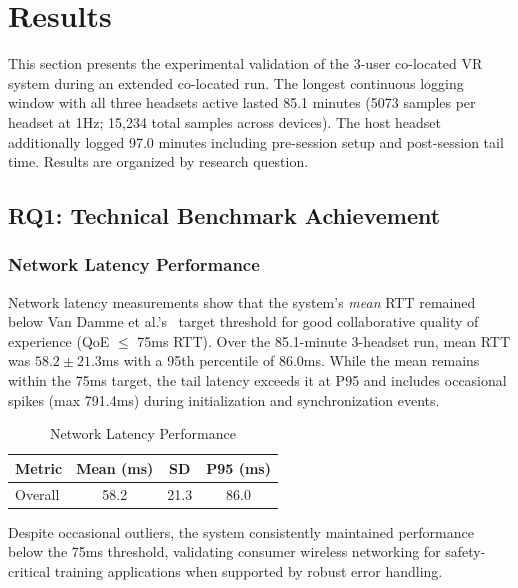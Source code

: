 \section{Results}

This section presents the experimental validation of the 3-user co-located VR system during an extended co-located run. The longest continuous logging window with all three headsets active lasted 85.1 minutes (5073 samples per headset at 1Hz; 15,234 total samples across devices). The host headset additionally logged 97.0 minutes including pre-session setup and post-session tail time. Results are organized by research question.

\subsection{RQ1: Technical Benchmark Achievement}

\subsubsection{Network Latency Performance}

Network latency measurements show that the system's \emph{mean} RTT remained below Van Damme et al.'s~\cite{VanDammeSam2024Iolo} target threshold for good collaborative quality of experience (QoE $\leq$ 75ms RTT). Over the 85.1-minute 3-headset run, mean RTT was $58.2 \pm 21.3$ms with a 95th percentile of 86.0ms. While the mean remains within the 75ms target, the tail latency exceeds it at P95 and includes occasional spikes (max 791.4ms) during initialization and synchronization events.

\begin{table}[h]
\centering
\caption{Network Latency Performance}
\begin{tabular}{|l|c|c|c|}
\hline
			\textbf{Metric} & \textbf{Mean (ms)} & \textbf{SD} & \textbf{P95 (ms)} \\
\hline
Overall & 58.2 & 21.3 & 86.0 \\
\hline
\end{tabular}
\end{table}

Despite occasional outliers, the system consistently maintained performance below the 75ms threshold, validating consumer wireless networking for safety-critical training applications when supported by robust error handling.

